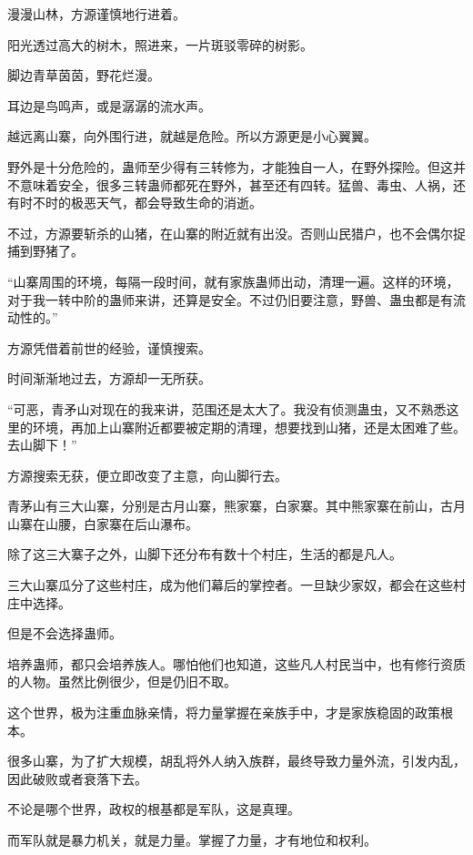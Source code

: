 
\begin{this_body}

漫漫山林，方源谨慎地行进着。

阳光透过高大的树木，照进来，一片斑驳零碎的树影。

脚边青草茵茵，野花烂漫。

耳边是鸟鸣声，或是潺潺的流水声。

越远离山寨，向外围行进，就越是危险。所以方源更是小心翼翼。

野外是十分危险的，蛊师至少得有三转修为，才能独自一人，在野外探险。但这并不意味着安全，很多三转蛊师都死在野外，甚至还有四转。猛兽、毒虫、人祸，还有时不时的极恶天气，都会导致生命的消逝。

不过，方源要斩杀的山猪，在山寨的附近就有出没。否则山民猎户，也不会偶尔捉捕到野猪了。

“山寨周围的环境，每隔一段时间，就有家族蛊师出动，清理一遍。这样的环境，对于我一转中阶的蛊师来讲，还算是安全。不过仍旧要注意，野兽、蛊虫都是有流动性的。”

方源凭借着前世的经验，谨慎搜索。

时间渐渐地过去，方源却一无所获。

“可恶，青矛山对现在的我来讲，范围还是太大了。我没有侦测蛊虫，又不熟悉这里的环境，再加上山寨附近都要被定期的清理，想要找到山猪，还是太困难了些。去山脚下！”

方源搜索无获，便立即改变了主意，向山脚行去。

青茅山有三大山寨，分别是古月山寨，熊家寨，白家寨。其中熊家寨在前山，古月山寨在山腰，白家寨在后山瀑布。

除了这三大寨子之外，山脚下还分布有数十个村庄，生活的都是凡人。

三大山寨瓜分了这些村庄，成为他们幕后的掌控者。一旦缺少家奴，都会在这些村庄中选择。

但是不会选择蛊师。

培养蛊师，都只会培养族人。哪怕他们也知道，这些凡人村民当中，也有修行资质的人物。虽然比例很少，但是仍旧不取。

这个世界，极为注重血脉亲情，将力量掌握在亲族手中，才是家族稳固的政策根本。

很多山寨，为了扩大规模，胡乱将外人纳入族群，最终导致力量外流，引发内乱，因此破败或者衰落下去。

不论是哪个世界，政权的根基都是军队，这是真理。

而军队就是暴力机关，就是力量。掌握了力量，才有地位和权利。


\end{this_body}
